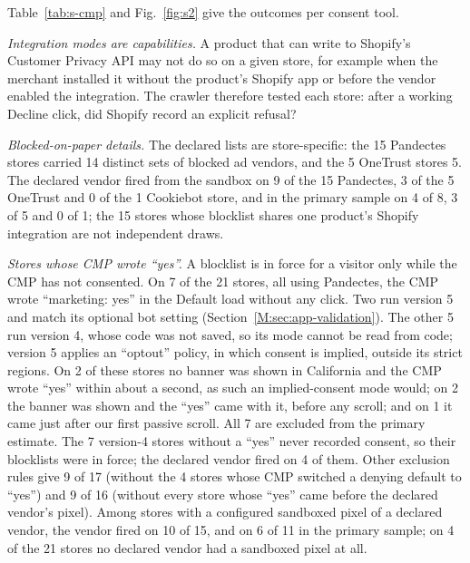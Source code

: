 \documentclass[preprint,11pt,authoryear,a4paper]{elsarticle}
\begin{document}
Table~\ref{tab:s-cmp} and Fig.~\ref{fig:s2} give the outcomes per consent tool.

\emph{Integration modes are capabilities.} A product that can write to Shopify's Customer Privacy API may not do so on a given store, for example when the merchant installed it without the product's Shopify app or before the vendor enabled the integration. The crawler therefore tested each store: after a working Decline click, did Shopify record an explicit refusal?

\emph{Blocked-on-paper details.} The declared lists are store-specific: the 15 Pandectes stores carried 14 distinct sets of blocked ad vendors, and the 5 OneTrust stores 5. The declared vendor fired from the sandbox on 9 of the 15 Pandectes, 3 of the 5 OneTrust and 0 of the 1 Cookiebot store, and in the primary sample on 4 of 8, 3 of 5 and 0 of 1; the 15 stores whose blocklist shares one product's Shopify integration are not independent draws.

\emph{Stores whose CMP wrote ``yes''.} A blocklist is in force for a visitor only while the CMP has not consented. On 7 of the 21 stores, all using Pandectes, the CMP wrote ``marketing: yes'' in the Default load without any click. Two run version 5 and match its optional bot setting (Section~\ref*{M:sec:app-validation}). The other 5 run version 4, whose code was not saved, so its mode cannot be read from code; version 5 applies an ``optout'' policy, in which consent is implied, outside its strict regions. On 2 of these stores no banner was shown in California and the CMP wrote ``yes'' within about a second, as such an implied-consent mode would; on 2 the banner was shown and the ``yes'' came with it, before any scroll; and on 1 it came just after our first passive scroll. All 7 are excluded from the primary estimate. The 7 version-4 stores without a ``yes'' never recorded consent, so their blocklists were in force; the declared vendor fired on 4 of them. Other exclusion rules give 9 of 17 (without the 4 stores whose CMP switched a denying default to ``yes'') and 9 of 16 (without every store whose ``yes'' came before the declared vendor's pixel). Among stores with a configured sandboxed pixel of a declared vendor, the vendor fired on 10 of 15, and on 6 of 11 in the primary sample; on 4 of the 21 stores no declared vendor had a sandboxed pixel at all.
\end{document}
